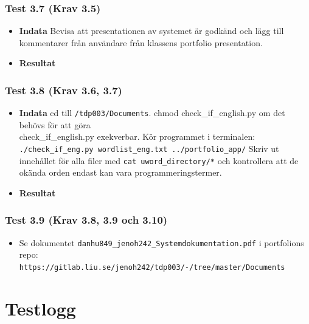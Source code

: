 \documentclass{TDP003mall}
\begin{document}
\subsubsection*{Test 3.7 (Krav 3.5)}
\begin{itemize}
\item[]\textbf{Indata} Bevisa att presentationen av systemet är godkänd och lägg till kommentarer från användare från klassens portfolio presentation.
\item[]\textbf{Resultat} %
\end{itemize}
\subsubsection*{Test 3.8 (Krav 3.6, 3.7)}
\begin{itemize}
\item[]\textbf{Indata} cd till \texttt{/tdp003/Documents}. chmod check\_if\_english.py om det behövs för att göra \\check\_if\_english.py exekverbar. Kör programmet i terminalen: \texttt{./check\_if\_eng.py wordlist\_eng.txt ../portfolio\_app/} Skriv ut innehållet för alla filer med \texttt{cat uword\_directory/*} och kontrollera att de okända orden endast kan vara programmeringstermer.
\item[]\textbf{Resultat} 
\end{itemize}
\subsubsection*{Test 3.9 (Krav 3.8, 3.9 och 3.10)}
\begin{itemize}
\item[] Se dokumentet \texttt{danhu849\_jenoh242\_Systemdokumentation.pdf} i portfolions repo:\\
  \texttt{https://gitlab.liu.se/jenoh242/tdp003/-/tree/master/Documents}
\end{itemize}





\section{Testlogg}
\end{document}
